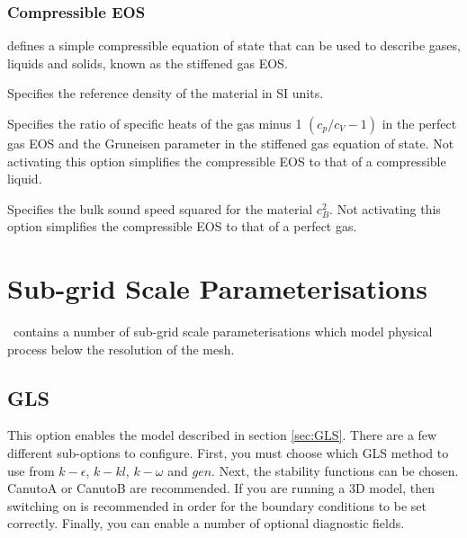 \subsubsection{Compressible EOS}\label{sec:Multi-material compressible EOS}
 defines a simple compressible equation of state that can be used to describe gases, liquids and solids, known as the stiffened gas EOS. %

\begin{description}
\item{} Specifies the reference density of the material in SI units.
\item{} Specifies the ratio of specific heats of the gas minus 1 $(c_p/c_V-1)$ in the perfect gas EOS and the Gruneisen parameter in the stiffened gas equation of state. Not activating this option simplifies the compressible EOS to that of a compressible liquid.
\item{} Specifies the bulk sound speed squared for the material $c_B^2$. Not activating this option simplifies the compressible EOS to that of a perfect gas.
\end{description}

\section{Sub-grid Scale Parameterisations}
\label{sec:sub-grid-scale-parameterisations}

\fluidity\ contains a number of sub-grid scale parameterisations which model physical process below the resolution of the mesh.

\subsection{GLS}

This option enables the model described in section \ref{sec:GLS}. There are a few different 
sub-options to configure. First, you must choose which GLS method to use 
from $k-\epsilon$, $k-kl$, $k-\omega$ and $gen$. Next, the stability functions
can be chosen. CanutoA or CanutoB are recommended. If you are running a 3D model, then switching on  
 is recommended in order for the boundary conditions to be set correctly. 
Finally, you can enable a number of optional diagnostic fields.

